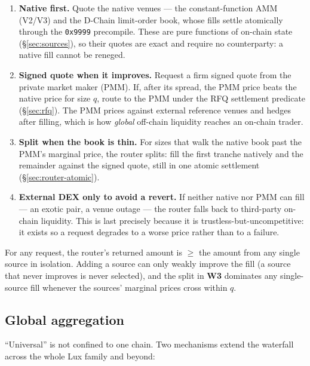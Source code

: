 \begin{enumerate}[label=\textbf{W\arabic*.}]
  \item \textbf{Native first.} Quote the native venues --- the
  constant-function AMM (V2/V3) and the D-Chain limit-order book, whose
  fills settle atomically through the \texttt{0x9999} precompile. These are
  pure functions of on-chain state (\S\ref{sec:sources}), so their quotes
  are exact and require no counterparty: a native fill cannot be reneged.
  \item \textbf{Signed quote when it improves.} Request a firm signed quote
  from the private market maker (PMM). If, after its spread, the PMM price
  beats the native price for size $q$, route to the PMM under the RFQ
  settlement predicate (\S\ref{sec:rfq}). The PMM prices against external
  reference venues and hedges after filling, which is how \emph{global}
  off-chain liquidity reaches an on-chain trader.
  \item \textbf{Split when the book is thin.} For sizes that walk the
  native book past the PMM's marginal price, the router splits: fill the
  first tranche natively and the remainder against the signed quote, still
  in one atomic settlement (\S\ref{sec:router-atomic}).
  \item \textbf{External DEX only to avoid a revert.} If neither native nor
  PMM can fill --- an exotic pair, a venue outage --- the router falls back
  to third-party on-chain liquidity. This is last precisely because it is
  trustless-but-uncompetitive: it exists so a request degrades to a worse
  price rather than to a failure.
\end{enumerate}

\begin{property}
For any request, the router's returned amount is $\geq$ the amount from any
single source in isolation. Adding a source can only weakly improve the
fill (a source that never improves is never selected), and the split in
\textbf{W3} dominates any single-source fill whenever the sources' marginal
prices cross within $q$.
\end{property}

\subsection{Global aggregation}
\label{sec:router-global}

``Universal'' is not confined to one chain. Two mechanisms extend the
waterfall across the whole Lux family and beyond:

